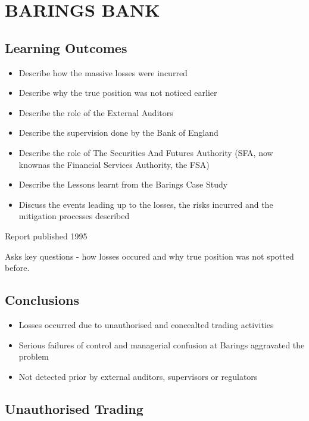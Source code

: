 \documentclass[PRMIA4A.tex]{subfiles}
\begin{document}
 
\newpage
\section{BARINGS BANK}

\subsection{Learning Outcomes}
\begin{itemize}
	\item Describe how the massive losses were incurred
	\item Describe why the true position was not noticed earlier
	\item Describe the role of the External Auditors
	\item Describe the supervision done by the Bank of England
	\item Describe the role of The Securities And Futures Authority
	(SFA, now knownas the Financial Services Authority, the FSA)
	\item Describe the Lessons learnt from the Barings Case Study
	\item Discuss the events leading up to the losses, the risks incurred and
	the mitigation processes described
\end{itemize}
	
Report published 1995

Asks key questions - how losses occured and why true position was not spotted before.

\subsection{Conclusions}

\begin{itemize}
\item Losses occurred due to unauthorised and concealted trading activities
\item Serious failures of control and managerial confusion at Barings aggravated the problem
\item Not detected prior by external auditors, supervisors or regulators
\end{itemize}
\newpage
\subsection{Unauthorised Trading}
\end{document}
